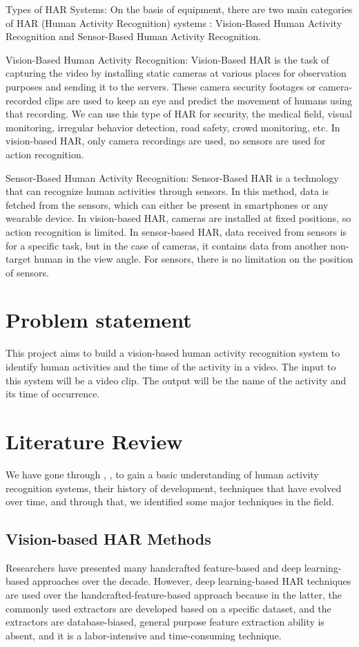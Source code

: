 \documentclass[twocolumn]{article}
\begin{document}
Types of HAR Systems:
On the basis of equipment, there are two main categories of HAR (Human Activity Recognition) systems :
Vision-Based Human Activity Recognition and Sensor-Based Human Activity Recognition.

Vision-Based Human Activity Recognition:
Vision-Based HAR is the task of capturing the video by installing static cameras at various places for observation purposes and sending it to the servers. 
These camera security footages or camera-recorded clips are used to keep an eye and predict the movement of humans using that recording. We can use this type of HAR for 
security, the medical field, visual monitoring, irregular behavior detection, road safety, crowd monitoring, etc. In vision-based HAR, only camera recordings are used, no 
sensors are used for action recognition.

Sensor-Based Human Activity Recognition:
Sensor-Based HAR is a technology that can recognize human activities through sensors. In this method, data is fetched from the sensors, which can either be present in 
smartphones or any wearable device. In vision-based HAR, cameras are installed at fixed positions, so action recognition is limited. In sensor-based HAR, data received 
from sensors is for a specific task, but in the case of cameras, it contains data 
from another non-target human in the view angle. For sensors, there is no limitation on the position of sensors.


\section{Problem statement}
This project aims to build a vision-based human activity recognition system to identify human activities and the time of the activity in a video. The input to this system
will be a video clip. The output will be the name of the activity and its time of occurrence.

\section{Literature Review}
We have gone through \cite{b1}, \cite{b2}, \cite{b3} to gain a basic understanding of human activity recognition systems, their history of development, techniques that 
have evolved over time, and through that, we identified some major techniques in the field.

\subsection{Vision-based HAR Methods}
Researchers have presented many handcrafted feature-based and deep learning-based approaches over the decade. However, deep learning-based HAR techniques are used over 
the handcrafted-feature-based approach because in the latter, the commonly used extractors are developed based on a specific dataset, and the extractors are database-biased, general 
purpose feature extraction ability is absent, and it is a labor-intensive and time-consuming technique.
\end{document}
